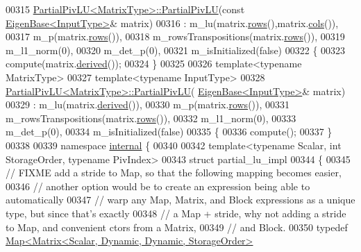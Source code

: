 \begin{DoxyCode}
00315 \hyperlink{group___l_u___module_a5c04818d354f94a98786d8a44cb709c6}{PartialPivLU<MatrixType>::PartialPivLU}(\textcolor{keyword}{const} 
      \hyperlink{group___core___module_struct_eigen_1_1_eigen_base}{EigenBase<InputType>}& matrix)
00316   : m\_lu(matrix.\hyperlink{group___core___module_a8141320ba8df384426c298b32b000d8e}{rows}(),matrix.\hyperlink{group___core___module_a7b0b45c7351847696c911ce8aa2abbdb}{cols}()),
00317     m\_p(matrix.\hyperlink{group___core___module_a8141320ba8df384426c298b32b000d8e}{rows}()),
00318     m\_rowsTranspositions(matrix.\hyperlink{group___core___module_a8141320ba8df384426c298b32b000d8e}{rows}()),
00319     m\_l1\_norm(0),
00320     m\_det\_p(0),
00321     m\_isInitialized(\textcolor{keyword}{false})
00322 \{
00323   compute(matrix.\hyperlink{group___core___module_a324b16961a11d2ecfd2d1b7dd7946545}{derived}());
00324 \}
00325 
00326 \textcolor{keyword}{template}<\textcolor{keyword}{typename} MatrixType>
00327 \textcolor{keyword}{template}<\textcolor{keyword}{typename} InputType>
00328 \hyperlink{group___l_u___module_a5c04818d354f94a98786d8a44cb709c6}{PartialPivLU<MatrixType>::PartialPivLU}(
      \hyperlink{group___core___module_struct_eigen_1_1_eigen_base}{EigenBase<InputType>}& matrix)
00329   : m\_lu(matrix.\hyperlink{group___core___module_a324b16961a11d2ecfd2d1b7dd7946545}{derived}()),
00330     m\_p(matrix.\hyperlink{group___core___module_a8141320ba8df384426c298b32b000d8e}{rows}()),
00331     m\_rowsTranspositions(matrix.\hyperlink{group___core___module_a8141320ba8df384426c298b32b000d8e}{rows}()),
00332     m\_l1\_norm(0),
00333     m\_det\_p(0),
00334     m\_isInitialized(\textcolor{keyword}{false})
00335 \{
00336   compute();
00337 \}
00338 
00339 \textcolor{keyword}{namespace }\hyperlink{namespaceinternal}{internal} \{
00340 
00342 \textcolor{keyword}{template}<\textcolor{keyword}{typename} Scalar, \textcolor{keywordtype}{int} StorageOrder, \textcolor{keyword}{typename} PivIndex>
00343 \textcolor{keyword}{struct }partial\_lu\_impl
00344 \{
00345   \textcolor{comment}{// FIXME add a stride to Map, so that the following mapping becomes easier,}
00346   \textcolor{comment}{// another option would be to create an expression being able to automatically}
00347   \textcolor{comment}{// warp any Map, Matrix, and Block expressions as a unique type, but since that's exactly}
00348   \textcolor{comment}{// a Map + stride, why not adding a stride to Map, and convenient ctors from a Matrix,}
00349   \textcolor{comment}{// and Block.}
00350   \textcolor{keyword}{typedef} \hyperlink{group___core___module_class_eigen_1_1_map}{Map<Matrix<Scalar, Dynamic, Dynamic, StorageOrder>}

\end{DoxyCode}
